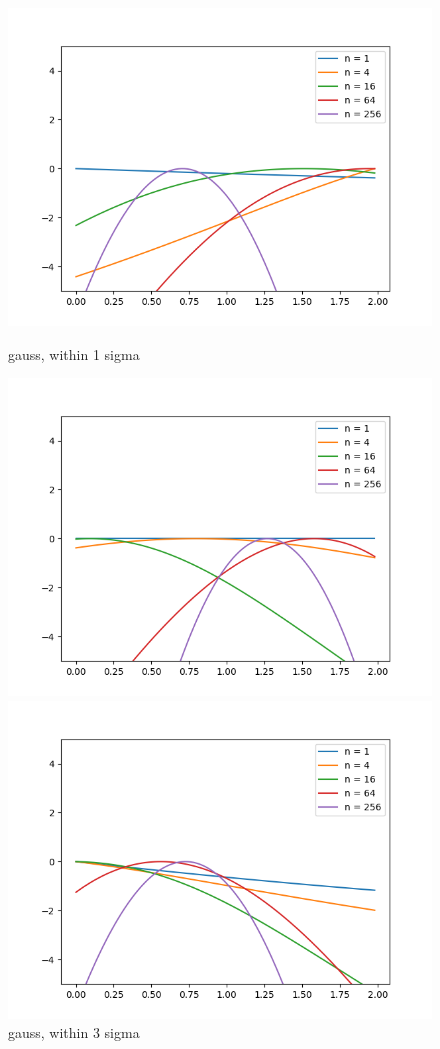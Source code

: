 \documentclass[english]{scrartcl}
\begin{document}
\begin{figure}[H]
	\includegraphics[width=\linewidth]{lighthouse/1d/h=0.4/gauss_1sigma}
	\caption{gauss, within 1 sigma}  
	\endminipage \hfill
	\includegraphics[width=\linewidth]{lighthouse/1d/h=0.4/gauss_3sigma}
	\caption{gauss, within 3 sigma} 
	\endminipage \hfill
	\includegraphics[width=\linewidth]{lighthouse/1d/h=0.4/gauss_far}

\end{figure}
\end{document}
